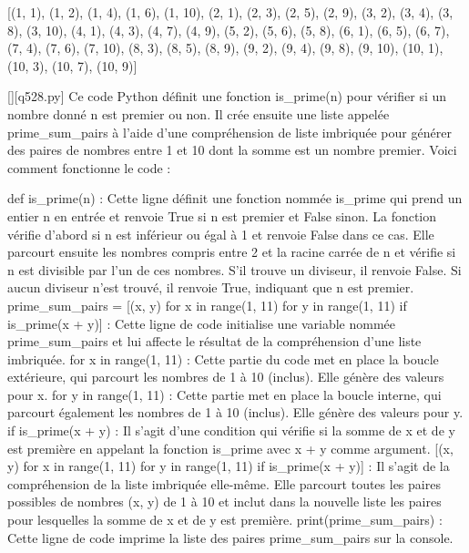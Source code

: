 [(1, 1), (1, 2), (1, 4), (1, 6), (1, 10), (2, 1), (2, 3), (2, 5), (2, 9), (3, 2), (3, 4), (3, 8), (3, 10), (4, 1), (4, 3), (4, 7), (4, 9), (5, 2), (5, 6), (5, 8), (6, 1), (6, 5), (6, 7), (7, 4), (7, 6), (7, 10), (8, 3), (8, 5), (8, 9), (9, 2), (9, 4), (9, 8), (9, 10), (10, 1), (10, 3), (10, 7), (10, 9)]
        \par
        \begin{solution}
            \renewcommand{\nomfichier}{q528.py}
            \pythonfile{\chemincode \nomfichier}[][\nomfichier]
            Ce code Python définit une fonction is\_prime(n) pour vérifier si un nombre donné n est premier ou non. Il crée ensuite une liste appelée prime\_sum\_pairs à l'aide d'une compréhension de liste imbriquée pour générer des paires de nombres entre 1 et 10 dont la somme est un nombre premier. Voici comment fonctionne le code :

    def is\_prime(n) : Cette ligne définit une fonction nommée is\_prime qui prend un entier n en entrée et renvoie True si n est premier et False sinon. La fonction vérifie d'abord si n est inférieur ou égal à 1 et renvoie False dans ce cas. Elle parcourt ensuite les nombres compris entre 2 et la racine carrée de n et vérifie si n est divisible par l'un de ces nombres. S'il trouve un diviseur, il renvoie False. Si aucun diviseur n'est trouvé, il renvoie True, indiquant que n est premier.
    prime\_sum\_pairs = [(x, y) for x in range(1, 11) for y in range(1, 11) if is\_prime(x + y)] : Cette ligne de code initialise une variable nommée prime\_sum\_pairs et lui affecte le résultat de la compréhension d'une liste imbriquée.
        for x in range(1, 11) : Cette partie du code met en place la boucle extérieure, qui parcourt les nombres de 1 à 10 (inclus). Elle génère des valeurs pour x.
        for y in range(1, 11) : Cette partie met en place la boucle interne, qui parcourt également les nombres de 1 à 10 (inclus). Elle génère des valeurs pour y.
        if is\_prime(x + y) : Il s'agit d'une condition qui vérifie si la somme de x et de y est première en appelant la fonction is\_prime avec x + y comme argument.
        [(x, y) for x in range(1, 11) for y in range(1, 11) if is\_prime(x + y)] : Il s'agit de la compréhension de la liste imbriquée elle-même. Elle parcourt toutes les paires possibles de nombres (x, y) de 1 à 10 et inclut dans la nouvelle liste les paires pour lesquelles la somme de x et de y est première.
    print(prime\_sum\_pairs) : Cette ligne de code imprime la liste des paires prime\_sum\_pairs sur la console.
        \end{solution}
        

